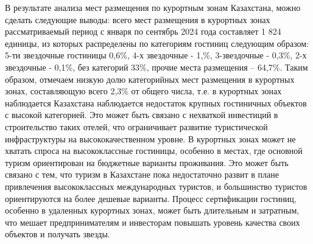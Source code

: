 
В результате анализа мест размещения по курортным зонам Казахстана,
можно сделать следующие выводы: всего мест размещения в курортных зонах
рассматриваемый период с января по сентябрь 2024 года составляет 1 824
единицы, из которых распределены по категориям гостиниц следующим
образом: 5-ти звездочные гостиницы 0,6\%, 4-х звездочные - 1,\%,
3-звездочные - 0,3\%, 2-х звездочные - 0,1\%, без категорий 33\%, прочие
места размещения -- 64,7\%. Таким образом, отмечаем низкую долю
категорийных мест размещения в курортных зонах, составляющую всего 2,3\%
от общего числа, т.е. в курортных зонах наблюдается Казахстана
наблюдается недостаток крупных гостиничных объектов с высокой
категорией. Это может быть связано с нехваткой инвестиций в
строительство таких отелей, что ограничивает развитие туристической
инфраструктуры на высококачественном уровне. В курортных зонах может не
хватать спроса на высококлассные гостиницы, особенно в местах, где
основной туризм ориентирован на бюджетные варианты проживания. Это может
быть связано с тем, что туризм в Казахстане пока недостаточно развит в
плане привлечения высококлассных международных туристов, и большинство
туристов ориентируются на более дешевые варианты. Процесс сертификации
гостиниц, особенно в удаленных курортных зонах, может быть длительным и
затратным, что мешает предпринимателям и инвесторам повышать уровень
качества своих объектов и получать звезды.

